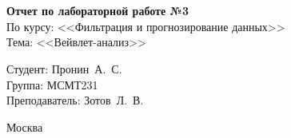 \begin{titlepage}
	\centering
	
	\vspace{-2.2mm}
	\vhrulefill{0.9mm}\\
	\vspace{-7mm}
	\vhrulefill{0.2mm}\\
	\vspace{2mm}
	
	\vspace{50mm}
	
	\vspace{30mm}
	
	\textbf{Отчет по лабораторной работе №3}\\
	По курсу: <<Фильтрация и прогнозирование данных>>\\
	Тема: <<Вейвлет-анализ>>\\
	
	\vspace{60mm}
	
	\hspace{70mm} Студент:       \hfill Пронин~А.~С.\\
	\hspace{70mm} Группа:        \hfill МСМТ231\\
	\hspace{70mm} Преподаватель: \hfill Зотов~Л.~В.\\
	
	\vfill
	
	Москва\\
	\the\year
\end{titlepage}

\setcounter{page}{2}